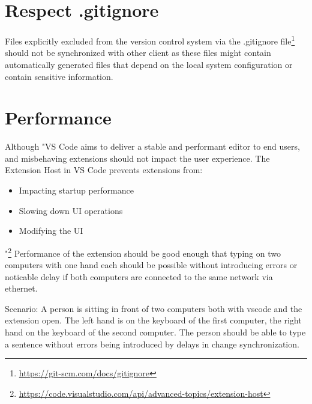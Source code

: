 \section{Respect .gitignore}

Files explicitly excluded from the version control system via the .gitignore file\footnote{\href{https://git-scm.com/docs/gitignore}{https://git-scm.com/docs/gitignore}} should not be synchronized with other client as these files might contain automatically generated files that depend on the local system configuration or contain sensitive information.

\section{Performance}

Although "VS Code aims to deliver a stable and performant editor to end users, and misbehaving extensions should not impact the user experience. The Extension Host in VS Code prevents extensions from:
\begin{itemize}
    \item Impacting startup performance
    \item Slowing down UI operations
    \item Modifying the UI
\end{itemize}"\footnote{\href{https://code.visualstudio.com/api/advanced-topics/extension-host}{https://code.visualstudio.com/api/advanced-topics/extension-host}}
Performance of the extension should be good enough that typing on two computers with one hand each should be possible without introducing errors or noticable delay if both computers are connected to the same network via ethernet.

Scenario: A person is sitting in front of two computers both with vscode and the extension open. The left hand is on the keyboard of the first computer, the right hand on the keyboard of the second computer. The person should be able to type a sentence without errors being introduced by delays in change synchronization.

